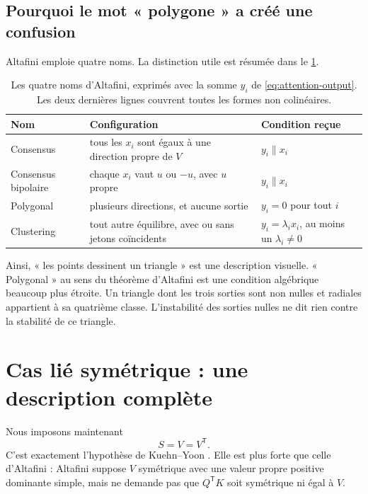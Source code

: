 \documentclass[11pt,a4paper]{article}
\theoremstyle{definition}
\newcommand{\T}{\mathsf T}
\begin{document}
\subsection{Pourquoi le mot « polygone » a créé une confusion}
\label{sec:terminology}

Altafini \cite{altafini2025multistability} emploie quatre noms. La distinction utile est
résumée dans le \cref{tab:altafini-classes}.

\begin{table}[ht]
\centering
\caption{Les quatre noms d'Altafini, exprimés avec la somme $y_i$ de
\eqref{eq:attention-output}. Les deux dernières lignes couvrent toutes les formes non
colinéaires.}
\label{tab:altafini-classes}
\begin{tabularx}{\textwidth}{@{}lXl@{}}
\toprule
Nom & Configuration & Condition reçue \\
\midrule
Consensus & tous les $x_i$ sont égaux à une direction propre de $V$ & $y_i\parallel x_i$ \\
Consensus bipolaire & chaque $x_i$ vaut $u$ ou $-u$, avec $u$ propre & $y_i\parallel x_i$ \\
Polygonal & plusieurs directions, et aucune sortie & $y_i=0$ pour tout $i$ \\
Clustering & tout autre équilibre, avec ou sans jetons coïncidents & $y_i=\lambda_i x_i$, au moins un $\lambda_i\neq0$ \\
\bottomrule
\end{tabularx}
\end{table}

Ainsi, « les points dessinent un triangle » est une description visuelle. « Polygonal »
au sens du théorème d'Altafini est une condition algébrique beaucoup plus étroite. Un
triangle dont les trois sorties sont non nulles et radiales appartient à sa quatrième
classe. L'instabilité des sorties nulles ne dit rien contre la stabilité de ce triangle.

\section{Cas lié symétrique : une description complète}
\label{sec:symmetric}

Nous imposons maintenant
\begin{equation}
 S=V=V^{\T}.                                                \label{eq:tied-symmetry}
\end{equation}
C'est exactement l'hypothèse de Kuehn--Yoon
\cite{kuehnyoon2026spectral}. Elle est plus forte que celle d'Altafini : Altafini suppose
$V$ symétrique avec une valeur propre positive dominante simple, mais ne demande pas que
$Q^{\T}K$ soit symétrique ni égal à $V$.
\end{document}
